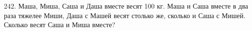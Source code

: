 242. Маша, Миша, Саша и Даша вместе  весят 100 кг. Маша и Саша вместе в два раза тяжелее Миши, Даша с Машей весят столько же, сколько и Саша с  Мишей. Сколько весят Саша и Миша вместе?\\
